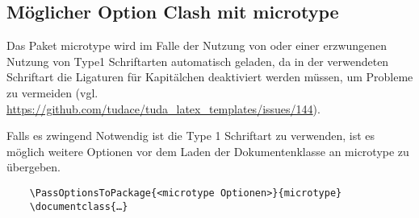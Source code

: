 \documentclass[
	ngerman,
	accentcolor=9c,%
	]{tudapub}
\let\pck\textsf
\begin{document}
\subsection{Möglicher Option Clash mit microtype}
Das Paket \pck{microtype} wird im Falle der Nutzung von  oder einer erzwungenen Nutzung von Type1 Schriftarten automatisch geladen, da in der verwendeten Schriftart die Ligaturen für Kapitälchen deaktiviert werden müssen, um Probleme zu vermeiden (vgl. \url{https://github.com/tudace/tuda_latex_templates/issues/144}).

Falls es zwingend Notwendig ist die Type 1 Schriftart zu verwenden, ist es möglich weitere Optionen vor dem Laden der Dokumentenklasse an \pck{microtype} zu übergeben.

\begin{verbatim}
	\PassOptionsToPackage{<microtype Optionen>}{microtype}
	\documentclass{…}
\end{verbatim}
\appendix
\printbibliography
\end{document}
